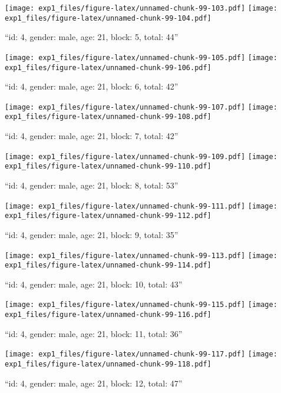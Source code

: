 \documentclass[,]{article}
\begin{document}
\texttt{[image: exp1\_files/figure-latex/unnamed-chunk-99-103.pdf]}
\texttt{[image: exp1\_files/figure-latex/unnamed-chunk-99-104.pdf]}

\newpage
[1] 

``id: 4, gender: male, age: 21, block: 5, total: 44''

\texttt{[image: exp1\_files/figure-latex/unnamed-chunk-99-105.pdf]}
\texttt{[image: exp1\_files/figure-latex/unnamed-chunk-99-106.pdf]}

\newpage
[1] 

``id: 4, gender: male, age: 21, block: 6, total: 42''

\texttt{[image: exp1\_files/figure-latex/unnamed-chunk-99-107.pdf]}
\texttt{[image: exp1\_files/figure-latex/unnamed-chunk-99-108.pdf]}

\newpage
[1] 

``id: 4, gender: male, age: 21, block: 7, total: 42''

\texttt{[image: exp1\_files/figure-latex/unnamed-chunk-99-109.pdf]}
\texttt{[image: exp1\_files/figure-latex/unnamed-chunk-99-110.pdf]}

\newpage
[1] 

``id: 4, gender: male, age: 21, block: 8, total: 53''

\texttt{[image: exp1\_files/figure-latex/unnamed-chunk-99-111.pdf]}
\texttt{[image: exp1\_files/figure-latex/unnamed-chunk-99-112.pdf]}

\newpage
[1] 

``id: 4, gender: male, age: 21, block: 9, total: 35''

\texttt{[image: exp1\_files/figure-latex/unnamed-chunk-99-113.pdf]}
\texttt{[image: exp1\_files/figure-latex/unnamed-chunk-99-114.pdf]}

\newpage
[1] 

``id: 4, gender: male, age: 21, block: 10, total: 43''

\texttt{[image: exp1\_files/figure-latex/unnamed-chunk-99-115.pdf]}
\texttt{[image: exp1\_files/figure-latex/unnamed-chunk-99-116.pdf]}

\newpage
[1] 

``id: 4, gender: male, age: 21, block: 11, total: 36''

\texttt{[image: exp1\_files/figure-latex/unnamed-chunk-99-117.pdf]}
\texttt{[image: exp1\_files/figure-latex/unnamed-chunk-99-118.pdf]}

\newpage
[1] 

``id: 4, gender: male, age: 21, block: 12, total: 47''
\end{document}
